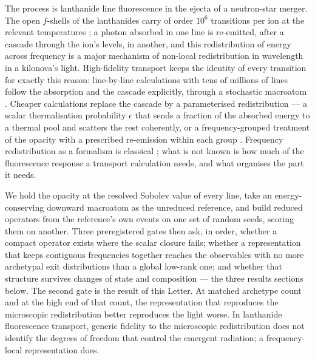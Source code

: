 \documentclass[aps,prl,twocolumn,superscriptaddress,nofootinbib,longbibliography]{revtex4-2}
\begin{document}
The process is lanthanide line fluorescence in the ejecta of a neutron-star
merger. The open $f$-shells of the lanthanides carry of order $10^6$
transitions per ion at the relevant temperatures \citep{barneskasen2013,
tanaka2020}; a photon absorbed in one line is re-emitted, after a cascade
through the ion's levels, in another, and this redistribution of energy
across frequency is a major mechanism of non-local redistribution in
wavelength in a kilonova's light. High-fidelity transport keeps the identity of every transition for
exactly this reason: line-by-line calculations with tens of millions of
lines follow the absorption and the cascade explicitly, through a
stochastic macroatom \citep{lucy2002,lucy2003,shingles2023}. Cheaper
calculations replace the cascade by a parameterised redistribution --- a
scalar thermalisation probability $\epsilon$ that sends a fraction of the
absorbed energy to a thermal pool and scatters the rest coherently, or a
frequency-grouped treatment of the opacity with a prescribed re-emission
within each group \citep{fontes2020}. Frequency redistribution as a
formalism is classical \citep{hummer1962}; what is not known is how much
of the fluorescence response a transport calculation needs, and what
organises the part it needs.

We hold the opacity at the resolved Sobolev value of every line, take an
energy-conserving downward macroatom as the unreduced reference, and build
reduced operators from the reference's own events on one set of random
seeds, scoring them on another. Three preregistered gates then ask, in
order, whether a compact operator exists where the scalar closure fails;
whether a representation that keeps contiguous frequencies together
reaches the observables with no more archetypal exit distributions than a
global low-rank one; and whether that structure survives changes of state
and composition --- the three results sections below. The second gate is
the result of this Letter. At matched archetype count and at the high end
of that count, the representation that reproduces the microscopic
redistribution better reproduces the light worse. In lanthanide
fluorescence transport, generic fidelity to the microscopic redistribution
does not identify the degrees of freedom that control the emergent
radiation; a frequency-local representation does.
\end{document}
